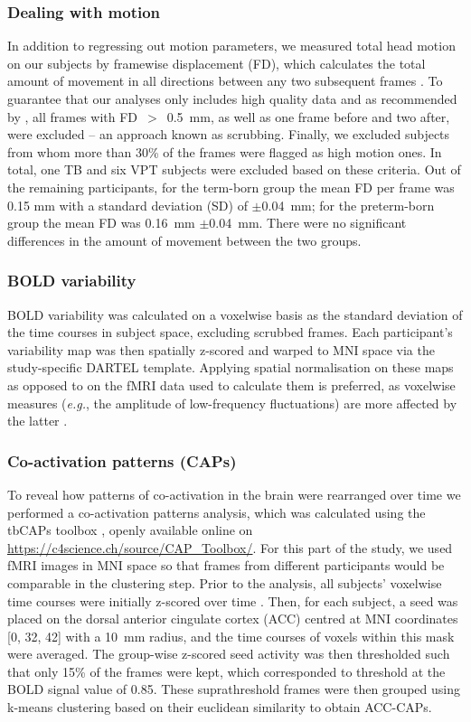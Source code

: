\subsubsection{Dealing with motion}\label{sec:motion}
In addition to regressing out motion parameters, we measured total head motion on our subjects by framewise displacement (FD), which calculates the total amount of movement in all directions between any two subsequent frames  \citep{Power2014a}. To guarantee that our analyses only includes high quality data and as recommended by \citeauthor{Power2014a}, all frames with FD~$>$~0.5~mm, as well as one frame before and two after, were excluded – an approach known as scrubbing. Finally, we excluded subjects from whom more than 30\% of the frames were flagged as high motion ones. In total, one TB and six VPT subjects were excluded based on these criteria. Out of the remaining participants, for the term-born group the mean FD per frame was 0.15 mm with a standard deviation (SD) of $\pm$0.04~mm; for the preterm-born group the mean FD was 0.16~mm $\pm$0.04~mm. There were no significant differences in the amount of movement between the two groups. 

\subsubsection{BOLD variability}\label{met:BOLDvar}

BOLD variability was calculated on a voxelwise basis as the standard deviation of the time courses in subject space, excluding scrubbed frames. Each participant's variability map was then spatially z-scored and warped to MNI space via the study-specific DARTEL template. Applying spatial normalisation on these maps as opposed to on the fMRI data used to calculate them is preferred, as voxelwise measures (\textit{e.g.}, the amplitude of low-frequency fluctuations) are more affected by the latter \citep{Wu2011}. 


\subsubsection{Co-activation patterns (CAPs)}
To reveal how patterns of co-activation in the brain were rearranged over time we performed a co-activation patterns analysis, which was calculated using the tbCAPs toolbox \citep{Bolton2020}, openly available online on \href{https://c4science.ch/source/CAP\_Toolbox/}{https://c4science.ch/source/CAP\_Toolbox/}. For this part of the study, we used fMRI images in MNI space so that frames from different participants would be comparable in the clustering step. Prior to the analysis, all subjects' voxelwise time courses were initially z-scored over time \citep{Liu2013}. Then, for each subject, a seed was placed on the dorsal anterior cingulate cortex (ACC) centred at MNI coordinates [0, 32, 42] \citep{Kolling2016} with a 10~mm radius, and the time courses of voxels within this mask were averaged. The group-wise z-scored seed activity was then thresholded such that only 15\% of the frames \citep{Liu2013} were kept, which corresponded to threshold at the BOLD signal value of 0.85. These suprathreshold frames were then grouped using k-means clustering based on their euclidean similarity to obtain ACC-CAPs. 

